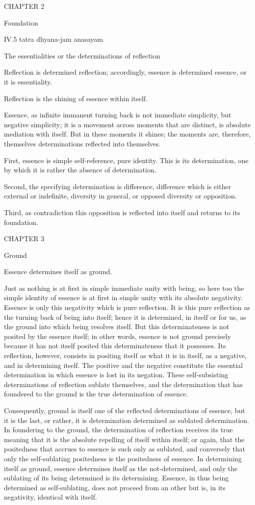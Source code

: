 CHAPTER 2

Foundation

IV.5
tatra dhyana-jam anasayam

The essentialities or the determinations of reflection

Reflection is determined reflection;
accordingly, essence is determined essence, or it is essentiality.

Reflection is the shining of essence within itself.

Essence, as infinite immanent turning back is
not immediate simplicity, but negative simplicity;
it is a movement across moments that are distinct,
is absolute mediation with itself.
But in these moments it shines;
the moments are, therefore, themselves
determinations reflected into themselves.

First, essence is simple self-reference, pure identity.
This is its determination, one by which it is rather
the absence of determination.

Second, the specifying determination is difference,
difference which is either external or indefinite,
diversity in general, or opposed diversity or opposition.

Third, as contradiction this opposition is reflected into itself
and returns to its foundation.

CHAPTER 3

Ground

Essence determines itself as ground.

Just as nothing is at first in simple immediate unity with being,
so here too the simple identity of essence is at first
in simple unity with its absolute negativity.
Essence is only this negativity which is pure reflection.
It is this pure reflection as the turning back of being into itself;
hence it is determined, in itself or for us,
as the ground into which being resolves itself.
But this determinateness is not posited by the essence itself;
in other words, essence is not ground precisely because
it has not itself posited this determinateness that it possesses.
Its reflection, however, consists in positing itself as
what it is in itself, as a negative, and in determining itself.
The positive and the negative constitute the essential determination
in which essence is lost in its negation.
These self-subsisting determinations of reflection sublate themselves,
and the determination that has foundered to the ground is
the true determination of essence.

Consequently, ground is itself one of
the reflected determinations of essence,
but it is the last, or rather,
it is determination determined as sublated determination.
In foundering to the ground, the determination of reflection
receives its true meaning that it is the absolute
repelling of itself within itself;
or again, that the positedness that accrues to essence is
such only as sublated,
and conversely that only the self-sublating positedness is
the positedness of essence.
In determining itself as ground,
essence determines itself as the not-determined,
and only the sublating of its being determined is its determining.
Essence, in thus being determined as self-sublating,
does not proceed from an other but is,
in its negativity, identical with itself.

